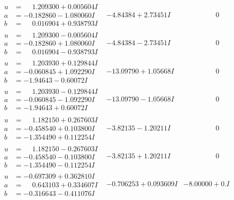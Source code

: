 \documentclass[1p]{elsarticle_modified}
\theoremstyle{definition}
\begin{document}
$$\begin{array}{c|c|c}
\begin{aligned}
u &= \phantom{-}1.209300 + 0.005604 I \\
a &= -0.182860 - 1.080060 I \\
b &= \phantom{-}0.016904 + 0.938793 I\end{aligned}
 & -4.84384 + 2.73451 I & \phantom{-0.000000 } 0 \\ \hline\begin{aligned}
u &= \phantom{-}1.209300 - 0.005604 I \\
a &= -0.182860 + 1.080060 I \\
b &= \phantom{-}0.016904 - 0.938793 I\end{aligned}
 & -4.84384 - 2.73451 I & \phantom{-0.000000 } 0 \\ \hline\begin{aligned}
u &= \phantom{-}1.203930 + 0.129844 I \\
a &= -0.060845 + 1.092290 I \\
b &= -1.94643 - 0.60072 I\end{aligned}
 & -13.09790 + 1.05668 I & \phantom{-0.000000 } 0 \\ \hline\begin{aligned}
u &= \phantom{-}1.203930 - 0.129844 I \\
a &= -0.060845 - 1.092290 I \\
b &= -1.94643 + 0.60072 I\end{aligned}
 & -13.09790 - 1.05668 I & \phantom{-0.000000 } 0 \\ \hline\begin{aligned}
u &= \phantom{-}1.182150 + 0.267603 I \\
a &= -0.458540 + 0.103800 I \\
b &= -1.354490 + 0.112254 I\end{aligned}
 & -3.82135 - 1.20211 I & \phantom{-0.000000 } 0 \\ \hline\begin{aligned}
u &= \phantom{-}1.182150 - 0.267603 I \\
a &= -0.458540 - 0.103800 I \\
b &= -1.354490 - 0.112254 I\end{aligned}
 & -3.82135 + 1.20211 I & \phantom{-0.000000 } 0 \\ \hline\begin{aligned}
u &= -0.697309 + 0.362810 I \\
a &= \phantom{-}0.643103 + 0.334607 I \\
b &= -0.316643 - 0.411076 I\end{aligned}
 & -0.706253 + 0.093609 I & -8.00000 + 0. I\phantom{ +0.000000I} \\ \hline\begin{aligned}

\end{aligned}
\end{array}$$
\end{document}
